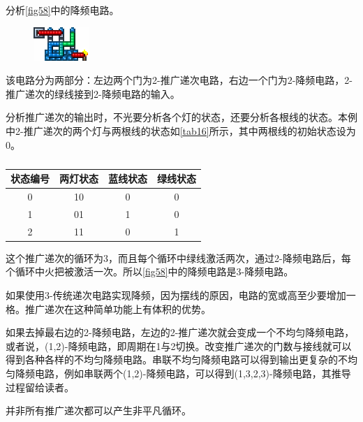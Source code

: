 \begin{example}
分析\autoref{fig58}中的降频电路。
\begin{figure}[!ht]
\centering
\includegraphics{images/332.png}
\caption{}\label{fig58}
\end{figure}
\end{example}
\begin{solution}
该电路分为两部分：左边两个门为2-推广递次电路，右边一个门为2-降频电路，2-推广递次的绿线接到2-降频电路的输入。

分析推广递次的输出时，不光要分析各个灯的状态，还要分析各根线的状态。本例中2-推广递次的两个灯与两根线的状态如\autoref{tab16}所示，其中两根线的初始状态设为0。

\begin{table}
\centering
\begin{tabular}{|c|c|c|c|}
\hline
状态编号&两灯状态&蓝线状态&绿线状态\\\hline
0&10&0&0\\\hline
1&01&1&0\\\hline
2&11&0&1\\\hline
\end{tabular}
\caption{}\label{tab16}
\end{table}

这个推广递次的循环为3，而且每个循环中绿线激活两次，通过2-降频电路后，每个循环中火把被激活一次。所以\autoref{fig58}中的降频电路是3-降频电路。

如果使用3-传统递次电路实现降频，因为摆线的原因，电路的宽或高至少要增加一格。推广递次在这种简单功能上有体积的优势。

如果去掉最右边的2-降频电路，左边的2-推广递次就会变成一个不均匀降频电路，或者说，(1,2)-降频电路，即周期在1与2切换。改变推广递次的门数与接线就可以得到各种各样的不均匀降频电路。串联不均匀降频电路可以得到输出更复杂的不均匀降频电路，例如串联两个(1,2)-降频电路，可以得到(1,3,2,3)-降频电路，其推导过程留给读者。

\end{solution}

并非所有推广递次都可以产生非平凡循环。

